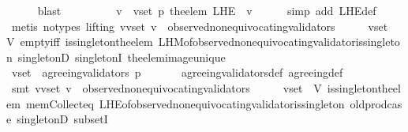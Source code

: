 \begin{isabellebody}
\ \ \ \ \isamarkupfalse%
\ blast\ \ \ \isanewline
\ \ \isamarkupfalse%
\ \isamarkupfalse%
\ {\isachardoublequoteopen}{\isasymforall}\ v\ {\isasymin}\ v{\isacharunderscore}set{\isachardot}\ p\ {\isacharparenleft}the{\isacharunderscore}elem\ {\isacharparenleft}L{\isacharunderscore}H{\isacharunderscore}E\ {\isasymsigma}\ v{\isacharparenright}{\isacharparenright}{\isachardoublequoteclose}\isanewline
\ \ \ \ \isamarkupfalse%
\ {\isacharparenleft}simp\ add{\isacharcolon}\ L{\isacharunderscore}H{\isacharunderscore}E{\isacharunderscore}def{\isacharparenright}\isanewline
\ \ \ \ \isamarkupfalse%
\ {\isacharparenleft}metis\ {\isacharparenleft}no{\isacharunderscore}types{\isacharcomma}\ lifting{\isacharparenright}\ {\isacartoucheopen}{\isasymforall}v{\isasymin}v{\isacharunderscore}set{\isachardot}\ v\ {\isasymin}\ observed{\isacharunderscore}non{\isacharunderscore}equivocating{\isacharunderscore}validators\ {\isasymsigma}{\isacartoucheclose}\ {\isacartoucheopen}{\isasymsigma}\ {\isasymin}\ {\isasymSigma}\ {\isasymand}\ v{\isacharunderscore}set\ {\isasymsubseteq}\ V{\isacartoucheclose}\ empty{\isacharunderscore}iff\ is{\isacharunderscore}singleton{\isacharunderscore}the{\isacharunderscore}elem\ L{\isacharunderscore}H{\isacharunderscore}M{\isacharunderscore}of{\isacharunderscore}observed{\isacharunderscore}non{\isacharunderscore}equivocating{\isacharunderscore}validator{\isacharunderscore}is{\isacharunderscore}singleton\ singletonD\ singletonI\ the{\isacharunderscore}elem{\isacharunderscore}image{\isacharunderscore}unique{\isacharparenright}\ \ \isanewline
\ \ \isamarkupfalse%
\ \isamarkupfalse%
\ {\isachardoublequoteopen}v{\isacharunderscore}set\ {\isasymsubseteq}\ agreeing{\isacharunderscore}validators\ {\isacharparenleft}p{\isacharcomma}\ {\isasymsigma}{\isacharparenright}{\isachardoublequoteclose}\isanewline
\ \ \ \ \isamarkupfalse%
\ agreeing{\isacharunderscore}validators{\isacharunderscore}def\ agreeing{\isacharunderscore}def\isanewline
\ \ \ \ \isamarkupfalse%
\ {\isacharparenleft}smt\ {\isacartoucheopen}{\isasymforall}v{\isasymin}v{\isacharunderscore}set{\isachardot}\ v\ {\isasymin}\ observed{\isacharunderscore}non{\isacharunderscore}equivocating{\isacharunderscore}validators\ {\isasymsigma}{\isacartoucheclose}\ {\isacartoucheopen}{\isasymsigma}\ {\isasymin}\ {\isasymSigma}\ {\isasymand}\ v{\isacharunderscore}set\ {\isasymsubseteq}\ V{\isacartoucheclose}\ is{\isacharunderscore}singleton{\isacharunderscore}the{\isacharunderscore}elem\ mem{\isacharunderscore}Collect{\isacharunderscore}eq\ L{\isacharunderscore}H{\isacharunderscore}E{\isacharunderscore}of{\isacharunderscore}observed{\isacharunderscore}non{\isacharunderscore}equivocating{\isacharunderscore}validator{\isacharunderscore}is{\isacharunderscore}singleton\ old{\isachardot}prod{\isachardot}case\ singletonD\ subsetI{\isacharparenright}\isanewline

\end{isabellebody}
